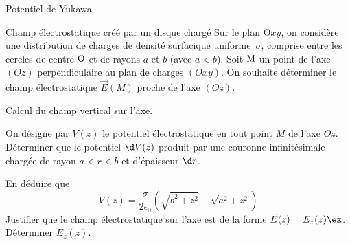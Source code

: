 \begin{exo}[PT][2][TD]{Potentiel de Yukawa}
\begin{quest}

\end{quest}
\end{exo}


\begin{exo}[PC][3][colle]{Champ électrostatique créé par un disque chargé}
  Sur le plan O$xy$, on considère une distribution de charges de densité surfacique uniforme~$\sigma$, comprise entre les cercles de centre $\rm O$ et de rayons $a$ et $b$ (avec $a<b$). Soit $\rm M$ un point de l'axe $(Oz)$ perpendiculaire au plan de charges $(Oxy)$. On souhaite déterminer le champ électrostatique $\Vec E(M)$ proche de l'axe $(Oz)$.


\begin{quest}
\question Calcul du champ vertical sur l'axe.
\begin{enumerate}[label=\alph*)]
\question On désigne par $V(z)$ le potentiel électrostatique en tout point $M$ de l'axe $Oz$. Déterminer que le potentiel $\d V(z)$ produit  par une couronne infinitésimale chargée de rayon $a<r<b$ et d'épaisseur $\d r$.

\question En déduire que
\begin{equation}
V(z) = \frac{\sigma}{2\epsilon_0}\left(\sqrt{b^2+z^2}-\sqrt{a^2+z^2}\right)
\end{equation}
\question Justifier que le champ électrostatique sur l'axe est de la forme $\Vec E (z) = E_z(z) \ez$. Déterminer $E_z(z)$.

\end{enumerate}
\end{quest}
\end{exo}
